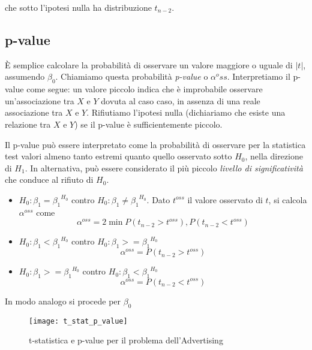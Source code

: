 che sotto l'ipotesi nulla ha distribuzione $t_{n-2}$.

\subsection{p-value}

È semplice calcolare la probabilità di osservare un valore maggiore o uguale di $|t|$, assumendo ${\beta}_0$. Chiamiamo questa probabilità \textit{p-value} o ${\alpha}^oss$. Interpretiamo il p-value come segue: un valore piccolo indica che è improbabile osservare un'associazione tra $X$ e $Y$ dovuta al caso caso, in assenza di una reale associazione tra  $X$ e $Y$. Rifiutiamo l'ipotesi nulla (dichiariamo che esiste una relazione tra $X$ e $Y$) se il p-value è sufficientemente piccolo.

Il p-value può essere interpretato come la probabilità di osservare per la statistica test valori almeno tanto estremi
quanto quello osservato sotto $H_0$, nella direzione di $H_1$. In alternativa, può essere considerato il più piccolo \textit{livello di significatività} che conduce al rifiuto di $H_0$.



\begin{itemize}
\item $H_{0}: {\beta}_1 = {{\beta}_1}^{H_0}$ contro $H_{0}: {\beta}_1 \neq {{\beta}_1}^{H_0}$. Dato $t^{oss}$ il valore osservato di $t$, si calcola ${\alpha}^{oss}$ come \begin{equation}
{\alpha}^{oss} = 2\min{P(t_{n-2} > t^{oss}),P(t_{n-2} < t^{oss})}
\end{equation}
\item $H_{0}: {\beta}_1 < {{\beta}_1}^{H_0}$ contro $H_{0}: {\beta}_1 >= {{\beta}_1}^{H_0}$
\begin{equation}
{\alpha}^{oss} = P(t_{n-2} > t^{oss})
\end{equation}
\item $H_{0}: {\beta}_1 >= {{\beta}_1}^{H_0}$ contro $H_{0}: {\beta}_1 < {{\beta}_1}^{H_0}$
\begin{equation}
{\alpha}^{oss} = P(t_{n-2} < t^{oss})
\end{equation}
\end{itemize}

In modo analogo si procede per ${\beta}_0$

\begin{figure}[H]
\centering
\texttt{[image: t\_stat\_p\_value]}
\caption{t-statistica e p-value per il problema dell'Advertising}
\end{figure}